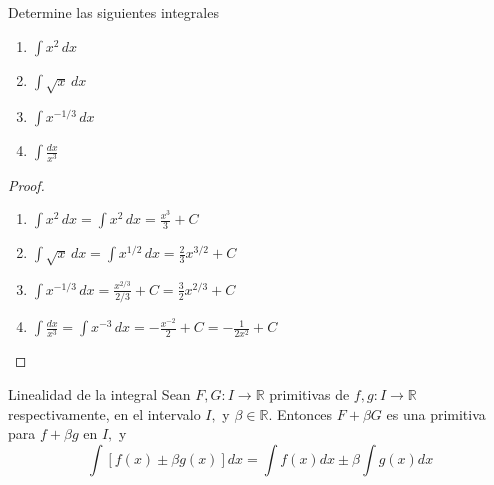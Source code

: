  

\begin{Ejemplo} Determine las siguientes integrales
\begin{multicols}{2}
\begin{enumerate}
\item $\displaystyle\int  x^{2}\,dx $
\item $\displaystyle\int \sqrt{x}\,dx$
\columnbreak
\item $\displaystyle\int x^{-1/3}\,dx$
\item $\displaystyle\int \frac{dx}{x^3}$
\end{enumerate}
\end{multicols}
\end{Ejemplo}

\begin{proof}
\begin{enumerate}
\item $\displaystyle\int  x^{2} \,dx =   \displaystyle\int x^{2} \,dx  = \frac{ x^3}{3}+C$ \\
\item  $\displaystyle\int \sqrt{x}\,dx =\displaystyle\int x^{1/2}\,dx = \frac{2}{3} x^{3/2} +C $ \\
\item   $\displaystyle\int x^{-1/3}\,dx= \frac{x^{2/3} }{2/3} +C = \frac{3}{2} x^{2/3}  +C $\\
\item $\displaystyle\int \frac{dx}{x^3}  = \displaystyle\int x^{-3}\,dx =  -\frac{x^{-2} }{2} +C = -\frac{1}{2x^2} +C  $  
\end{enumerate}
\end{proof}


\begin{teorema}{Linealidad de la integral}{}
Sean $F, G:I \to \mathbb R$  primitivas de  $f, g:I \to \mathbb R$ respectivamente, en el intervalo $I,$ y $\beta\in \mathbb R.$ Entonces $F+\beta G$ es una primitiva para $f+ \beta g$ en $I,$ y $$ \int [f(x)\pm \beta g(x)]dx= \int f(x)dx\pm \beta \int g(x)dx $$
\end{teorema}




